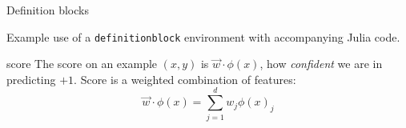 \begin{frame}[fragile]{Definition blocks}

Example use of a \texttt{definitionblock} environment with accompanying Julia code.

\begin{definitionblock}{score}
    The score on an example $(x,y)$ is $\vec{w}\cdot \phi(x)$, how \textit{confident} we are in predicting $+1$. Score is a weighted combination of features:
    \[
        \vec{w} \cdot \phi(x) = \sum_{j=1}^d w_j \phi(x)_j
    \]
\end{definitionblock}

\end{frame}